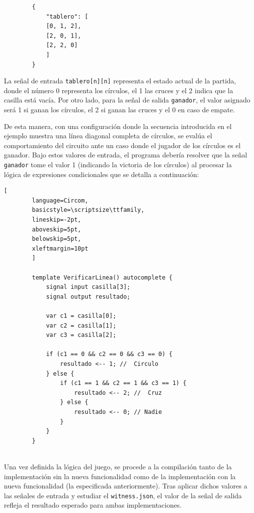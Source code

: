 \documentclass[a4paper,12pt]{report}
\begin{document}
	\vspace{0.2cm}
	\begin{lstlisting}
		{
			"tablero": [
			[0, 1, 2],
			[2, 0, 1],
			[2, 2, 0]
			]
		}
	\end{lstlisting}
	
	\endgroup
	
	\vspace{0.2cm}
	\noindent La señal de entrada \texttt{tablero[n][n]} representa el estado actual de la partida, donde el número 0 representa los círculos, el 1 las cruces y el 2 indica que la casilla está vacía. Por otro lado, para la señal de salida \texttt{ganador}, el valor asignado será 1 si ganan los círculos, el 2 si ganan las cruces y el 0 en caso de empate.
	
	
	\vspace{0.2cm}
	\noindent De esta manera, con una configuración donde la secuencia introducida en el ejemplo muestra una línea diagonal completa de círculos, se evalúa el comportamiento del circuito ante un caso donde el jugador de los círculos es el ganador. Bajo estos valores de entrada, el programa debería resolver que la señal \texttt{ganador} tome el valor 1 (indicando la victoria de los círculos) al procesar la lógica de expresiones condicionales que se detalla a continuación:
	
	\vspace{0.2cm}
	\begin{lstlisting}[
		language=Circom,
		basicstyle=\scriptsize\ttfamily, 
		lineskip=-2pt,                  
		aboveskip=5pt,                  
		belowskip=5pt,                  
		xleftmargin=10pt
		]
		
		template VerificarLinea() autocomplete {
			signal input casilla[3]; 
			signal output resultado;
			
			var c1 = casilla[0];
			var c2 = casilla[1];
			var c3 = casilla[2];
			
			if (c1 == 0 && c2 == 0 && c3 == 0) {
				resultado <-- 1; //  Circulo
			} else {
				if (c1 == 1 && c2 == 1 && c3 == 1) {
					resultado <-- 2; //  Cruz
				} else {
					resultado <-- 0; // Nadie
				}
			}
		}
		
	\end{lstlisting}
	
	\vspace{0.2cm}
	\noindent Una vez definida la lógica del juego, se procede a la compilación tanto de la implementación sin la nueva funcionalidad como de la implementación con la nueva funcionalidad (la especificada anteriormente). Tras aplicar dichos valores a las señales de entrada y estudiar el \texttt{witness.json}, el valor de la señal de salida refleja el resultado esperado para ambas implementaciones.
	
\end{document}
